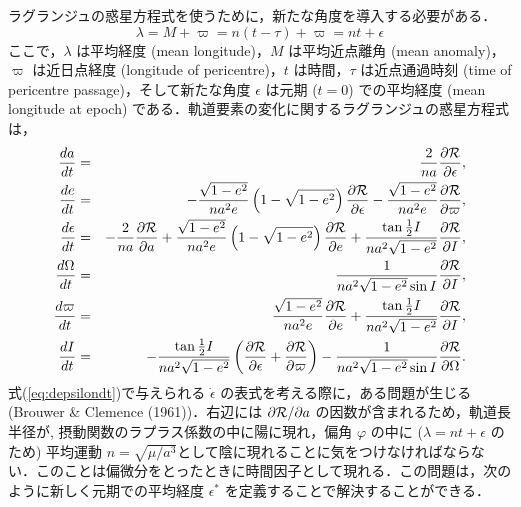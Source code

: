 \documentclass[11pt,a4paper,oneside,onecolumn]{jreport}
\begin{document}
ラグランジュの惑星方程式を使うために，新たな角度を導入する必要がある．
\begin{equation}
\lambda = M + \varpi = n (t - \tau) + \varpi = n t + \epsilon \label{eq:lambda}
\end{equation}
ここで，$\lambda$ は平均経度 (mean longitude)，$M$ は平均近点離角 (mean anomaly)，$\varpi$ は近日点経度 (longitude of pericentre)，$t$ は時間，$\tau$ は近点通過時刻 (time of pericentre passage)，そして新たな角度 $\epsilon$ は元期 ($t = 0$) での平均経度 (mean longitude at epoch) である．軌道要素の変化に関するラグランジュの惑星方程式は，
\begin{eqnarray}
\frac{d a}{d t} & = & \frac{2}{n a} \frac{\partial {\cal R}}{\partial \epsilon}, \label{eq:dadt} \\
\frac{d e}{d t} & = & - \frac{\sqrt{1 - e^2}}{n a^2 e} \left( 1 - \sqrt{1 - e^2} \right) \frac{\partial {\cal R}}{\partial \epsilon} - \frac{\sqrt{1 - e^2}}{n a^2 e} \frac{\partial {\cal R}}{\partial \varpi}, \label{eq:dedt} \\
\frac{d \epsilon}{d t} & = & - \frac{2}{n a} \frac{\partial {\cal R}}{\partial a} + \frac{\sqrt{1 - e^2}}{n a^2 e} \left( 1 - \sqrt{1 - e^2} \right) \frac{\partial {\cal R}}{\partial e} + \frac{\tan \frac{1}{2} I}{n a^2 \sqrt{1 - e^2}} \frac{\partial {\cal R}}{\partial I}, \label{eq:depsilondt} \\
\frac{d \Omega}{d t} & = & \frac{1}{n a^2 \sqrt{1 - e^2} \sin I} \frac{\partial {\cal R}}{\partial I}, \label{eq:dOmegadt} \\
\frac{d \varpi}{d t} & = & \frac{\sqrt{1 - e^2}}{n a^2 e} \frac{\partial {\cal R}}{\partial e} + \frac{\tan \frac{1}{2} I}{n a^2 \sqrt{1 - e^2}} \frac{\partial {\cal R}}{\partial I}, \label{eq:dvarpidt} \\
\frac{d I}{d t} & = & - \frac{\tan \frac{1}{2} I}{n a^2 \sqrt{1 - e^2}} \left( \frac{\partial {\cal R}}{\partial \epsilon} + \frac{\partial {\cal R}}{\partial \varpi} \right) - \frac{1}{n a^2 \sqrt{1 - e^2} \sin I} \frac{\partial {\cal R}}{\partial \Omega}. \label{eq:dIdt}
\end{eqnarray}
式(\ref{eq:depsilondt})で与えられる $\dot{\epsilon}$ の表式を考える際に，ある問題が生じる (Brouwer \& Clemence (1961))．右辺には $\partial {\cal R}/\partial a$ の因数が含まれるため，軌道長半径が, 
摂動関数のラプラス係数の中に陽に現れ，偏角 $\varphi$ の中に ($\lambda = n t + \epsilon$ のため) 平均運動 $n = \sqrt{\mu /a^3}$として陰に現れることに気をつけなければならない．このことは偏微分をとったときに時間因子として現れる．この問題は，次のように新しく元期での平均経度 $\epsilon^{\ast}$ を定義することで解決することができる．
\end{document}

